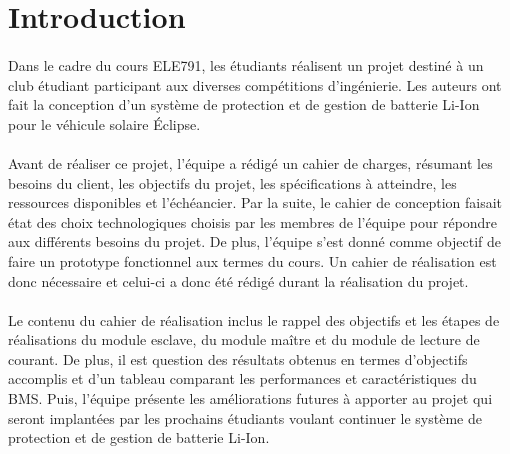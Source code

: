 \section{Introduction}

	\paragraph{}
	Dans le cadre du cours ELE791, les étudiants réalisent un projet destiné à un club étudiant participant aux diverses compétitions d’ingénierie. Les auteurs ont fait la conception d’un système de protection et de gestion de batterie Li-Ion pour le véhicule solaire Éclipse. 
	
	\paragraph{}
	Avant de réaliser ce projet, l’équipe a rédigé un cahier de charges, résumant les besoins du client, les objectifs du projet, les spécifications à atteindre, les ressources disponibles et l’échéancier. Par la suite, le cahier de conception faisait état des choix technologiques choisis par les membres de l’équipe pour répondre aux différents besoins du projet. De plus, l’équipe s’est donné comme objectif de faire un prototype fonctionnel aux termes du cours. Un cahier de réalisation est donc nécessaire et celui-ci a donc été rédigé durant la réalisation du projet.
	
	\paragraph{}
	Le contenu du cahier de réalisation inclus le rappel des objectifs et les étapes de réalisations du module esclave, du module maître et du module de lecture de courant. De plus, il est question des résultats obtenus en termes d’objectifs accomplis et d’un tableau comparant les performances et caractéristiques du BMS. Puis, l’équipe présente les améliorations futures à apporter au projet qui seront implantées par les prochains étudiants voulant continuer le système de protection et de gestion de batterie Li-Ion.
